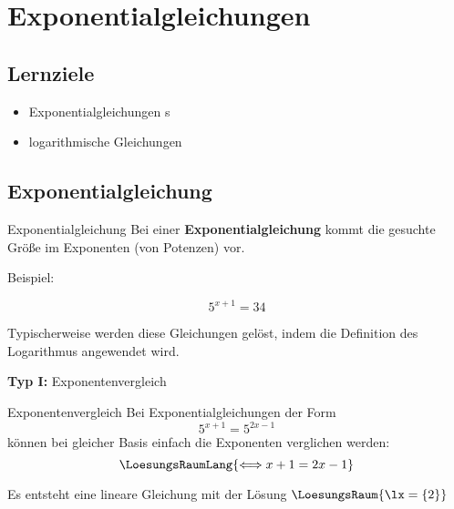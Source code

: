 

\section{Exponentialgleichungen}

\subsection*{Lernziele}

\begin{itemize}
\item Exponentialgleichungen s
\item logarithmische Gleichungen 
\end{itemize}



\newpage


\subsection{Exponentialgleichung}
\begin{definition}{Exponentialgleichung}{}
  Bei einer \textbf{Exponentialgleichung} kommt die gesuchte Größe im
  Exponenten (von Potenzen) vor.
\end{definition}

Beispiel:

$$5^{x+1} = 34$$

Typischerweise werden diese Gleichungen gelöst, indem die Definition
des Logarithmus angewendet wird.

\textbf{Typ I:} Exponentenvergleich\\

\begin{rezept}{Exponentenvergleich}{}
Bei Exponentialgleichungen der Form $$5^{x+1} = 5^{2x-1}$$ können bei
gleicher Basis einfach die Exponenten verglichen werden:
$$\LoesungsRaumLang{\Longleftrightarrow x+1=2x-1}$$

Es entsteht eine lineare Gleichung mit der Lösung $\LoesungsRaum{\lx = \{2\}}$
\end{rezept}


